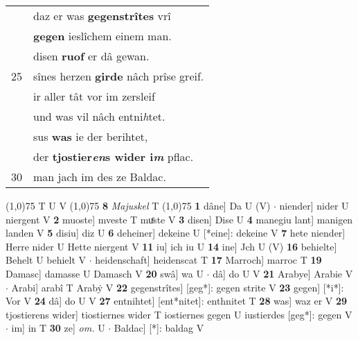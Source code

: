 \documentclass[8pt,a4paper,notitlepage]{article}
\begin{document}
\begin{table}[ht]
\begin{minipage}[t]{0.5\linewidth}
\begin{tabular}{rl}
 & daz er was \textbf{gegenstrîtes} vrî\\ 
 & \textbf{gegen} ieslîchem einem man.\\ 
 & disen \textbf{ruof} er dâ gewan.\\ 
25 & sînes herzen \textbf{girde} nâch prîse greif.\\ 
 & ir aller tât vor im zersleif\\ 
 & und was vil nâch entni\textit{h}tet.\\ 
 & sus \textbf{was} ie der berihtet,\\ 
 & der \textbf{tjostier\textit{en}s wider i\textit{m}} pflac.\\ 
30 & man jach im des ze Baldac.\\ 
\end{tabular}
\scriptsize
\line(1,0){75} \newline
T U V \newline
\line(1,0){75} \newline
\textbf{8} \textit{Majuskel} T  \newline
\line(1,0){75} \newline
\textbf{1} dâne] Da U (V)  $\cdot$ niender] nider U niergent V \textbf{2} muoste] mveste T muͤste V \textbf{3} disen] Dise U \textbf{4} manegiu lant] manigen landen V \textbf{5} disiu] diz U \textbf{6} deheiner] dekeine U [*eine]: dekeine V \textbf{7} hete niender] Herre nider U Hette niergent V \textbf{11} iu] ich iu U \textbf{14} ine] Jch U (V) \textbf{16} behielte] Behelt U behielt V  $\cdot$ heidenschaft] heidenscat T \textbf{17} Marroch] marroc T \textbf{19} Damasc] damasse U Damasch V \textbf{20} swâ] wa U  $\cdot$ dâ] do U V \textbf{21} Arabye] Arabie V  $\cdot$ Arabi] arabî T Arabẏ V \textbf{22} gegenstrîtes] [geg*]: gegen strite V \textbf{23} gegen] [*i*]: Vor V \textbf{24} dâ] do U V \textbf{27} entnihtet] [ent*nitet]: enthnitet T \textbf{28} was] waz er V \textbf{29} tjostierens wider] tiostiernes wider T iostiernes gegen U iustierdes [geg*]: gegen V  $\cdot$ im] in T \textbf{30} ze] \textit{om.} U  $\cdot$ Baldac] [*]: baldag V \newline
\end{minipage}
\end{table}
\end{document}
